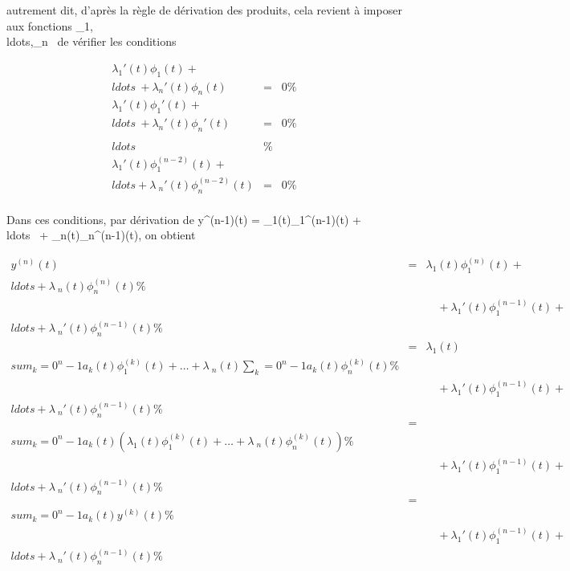 \documentclass[]{article}
\begin{document}
autrement dit, d'après la règle de dérivation des produits, cela revient
à imposer aux fonctions
\lambda_1,\\ldots,\lambda_n~
de vérifier les conditions

\begin{align*} \lambda_1'(t)\phi_1(t) +
\\ldots~ +
\lambda_n'(t)\phi_n(t)& =& 0\%&
\\ \lambda_1'(t)\phi_1'(t) +
\\ldots~ +
\lambda_n'(t)\phi_n'(t)& =& 0\%&
\\ &
\\ldots~& \%&
\\
\lambda_1'(t)\phi_1^(n-2)(t) +
\\ldots + \lambda~_
n'(t)\phi_n^(n-2)(t)& =& 0\%&
\\ \end{align*}

Dans ces conditions, par dérivation de y^(n-1)(t) =
\lambda_1(t)\phi_1^(n-1)(t) +
\\ldots~ +
\lambda_n(t)\phi_n^(n-1)(t), on obtient

\begin{align*} y^(n)(t)& =& \lambda_
1(t)\phi_1^(n)(t) +
\\ldots + \lambda~_
n(t)\phi_n^(n)(t) \%& \\
& & \quad +
\lambda_1'(t)\phi_1^(n-1)(t) +
\\ldots + \lambda~_
n'(t)\phi_n^(n-1)(t) \%&
\\ & =&
\lambda_1(t)\\sum
_k=0^n-1a_ k(t)\phi_1^(k)(t) +
\ldots + \lambda~_
n(t)\sum _k=0^n-1a_
k(t)\phi_n^(k)(t)\%& \\ &
& \quad + \lambda_1'(t)\phi_1^(n-1)(t) +
\\ldots + \lambda~_
n'(t)\phi_n^(n-1)(t) \%&
\\ & =& \\sum
_k=0^n-1a_ k(t)\left
(\lambda_1(t)\phi_1^(k)(t) +
\ldots + \lambda~_
n(t)\phi_n^(k)(t)\right ) \%&
\\ & & \quad +
\lambda_1'(t)\phi_1^(n-1)(t) +
\\ldots + \lambda~_
n'(t)\phi_n^(n-1)(t) \%&
\\ & =& \\sum
_k=0^n-1a_ k(t)y^(k)(t) \%&
\\ & & \quad +
\lambda_1'(t)\phi_1^(n-1)(t) +
\\ldots + \lambda~_
n'(t)\phi_n^(n-1)(t) \%&
\\ \end{align*}
\end{document}
